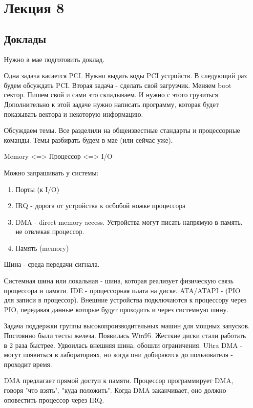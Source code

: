 \section{Лекция 8}

\subsection{Доклады}
Нужно в мае подготовить доклад.

\begin{hw} Одна задача касается PCI. Нужно выдать коды PCI устройств. В следующий раз будем обсуждать PCI. Вторая задача - сделать свой загрузчик. Меняем boot сектор. Пишем свой и сами это складываем. И нужно с этого грузиться. Дополнительно к этой задаче нужно написать программу, которая будет показывать вектора и некоторую информацию.
\end{hw}

Обсуждаем темы. Все разделили на общеизвестные стандарты и процессорные команды. Темы разбирать будем в мае (или сейчас уже).

Memory <=> Процессор <=> I/O

Можно запрашивать у системы:
\begin{enumerate}
\item Порты (к I/O)
\item IRQ - дорога от устройства к осбобой ножке процессора
\item DMA - direct memory access. Устройства могут писать напрямую в память, не отвлекая процессор.
\item Память (memory)
\end{enumerate}

\begin{defn} Шина - среда передачи сигнала.\end{defn} 
Системная шина или локальная - шина, которая реализует физическую связь процессора и памяти. IDE - процессорная плата на диске. ATA/ATAPI - (PIO для записи в процессор). Внешние устройства подключаются к процессору через PIO, передавая данные которые будут проходить и через системную шину. 

Задача поддержки группы высокопроизводительных машин для мощных запусков. Постоянно были тесты железа. Появилась Win95. Жесткие диски стали работать в 2 раза быстрее. Удвоилась внешняя шина, обошли ограничения. Ultra DMA - могут появиться в лабораториях, но когда они добираются до пользователя - проходит время.

DMA предлагает прямой доступ к памяти. Процессор программирует DMA, говоря "что взять", "куда положить". Когда DMA заканчивает, оно должно оповестить процессор через IRQ.

